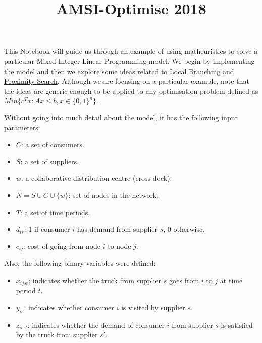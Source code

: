 \documentclass[11pt]{article}
\title{AMSI-Optimise 2018}
\providecommand{\tightlist}{%
      \setlength{\itemsep}{0pt}\setlength{\parskip}{0pt}}
\begin{document}
    
    
    \maketitle
    
    

    
    This Notebook will guide us through an example of using matheuristics to
solve a particular Mixed Integer Linear Programming model. We begin by
implementing the model and then we explore some ideas related to
\href{https://link.springer.com/article/10.1007/s10107-003-0395-5}{Local
Branching} and
\href{https://link.springer.com/article/10.1007/s10732-014-9266-x}{Proximity
Search}. Although we are focusing on a particular example, note that the
ideas are generic enough to be applied to any optimisation problem
defined as \(Min\{c^T x: Ax \leq b, x \in \{0, 1\}^n\}\).

Without going into much detail about the model, it has the following
input parameters:

\begin{itemize}
\tightlist
\item
  \(C\): a set of consumers.
\item
  \(S\): a set of suppliers.
\item
  \(w\): a collaborative distribution centre (cross-dock).
\item
  \(N = S \cup C \cup \{w\}\): set of nodes in the network.
\item
  \(T\): a set of time periods.
\item
  \(d_{is}\): 1 if consumer \(i\) has demand from supplier \(s\), 0
  otherwise.
\item
  \(c_{ij}\): cost of going from node \(i\) to node \(j\).
\end{itemize}

Also, the following binary variables were defined:

\begin{itemize}
\tightlist
\item
  \(x_{ijst}\): indicates whether the truck from supplier \(s\) goes
  from \(i\) to \(j\) at time period \(t\).
\item
  \(y_{is}\): indicates whether consumer \(i\) is visited by supplier
  \(s\).
\item
  \(z_{iss'}\): indicates whether the demand of consumer \(i\) from
  supplier \(s\) is satisfied by the truck from supplier \(s'\).
\end{itemize}
\end{document}
